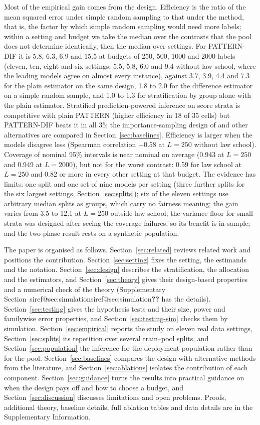 \documentclass[pdflatex,sn-mathphys-num,iicol]{sn-jnl}
\makeatletter
\theoremstyle{thmstyleone}
\theoremstyle{thmstyletwo}
\theoremstyle{thmstylethree}
\newcommand{\SIref}[1]{\ifcsname siref@#1\endcsname\csname siref@#1\endcsname\else\textbf{??}\fi}
\makeatother
\begin{document}
Most of the empirical gain comes from the design. Efficiency is the ratio of the mean squared error under simple random sampling to that under the method, that is, the factor by which simple random sampling would need more labels; within a setting and budget we take the median over the contrasts that the pool does not determine identically, then the median over settings. For PATTERN-DIF it is 5.8, 6.3, 6.9 and 15.5 at budgets of 250, 500, 1000 and 2000 labels (eleven, ten, eight and six settings; 5.5, 5.8, 6.0 and 9.4 without law school, where the leading models agree on almost every instance), against 3.7, 3.9, 4.4 and 7.3 for the plain estimator on the same design, 1.8 to 2.0 for the difference estimator on a simple random sample, and 1.0 to 1.3 for stratification by group alone with the plain estimator. Stratified prediction-powered inference \citep{fisch2024stratppi} on score strata is competitive with plain PATTERN (higher efficiency in 18 of 35 cells) but PATTERN-DIF beats it in all 35; the importance-sampling design of \citet{sawade2012active} and other alternatives are compared in Section~\ref{sec:baselines}. Efficiency is larger when the models disagree less (Spearman correlation $-0.58$ at $L=250$ without law school). Coverage of nominal 95\% intervals is near nominal on average (0.943 at $L=250$ and 0.949 at $L=2000$), but not for the worst contrast: 0.59 for law school at $L=250$ and 0.82 or more in every other setting at that budget. The evidence has limits: one split and one set of nine models per setting (three further splits for the six largest settings, Section~\ref{sec:splits}); six of the eleven settings use arbitrary median splits as groups, which carry no fairness meaning; the gain varies from 3.5 to 12.1 at $L=250$ outside law school; the variance floor for small strata was designed after seeing the coverage failures, so its benefit is in-sample; and the two-phase result rests on a synthetic population.

The paper is organised as follows. Section~\ref{sec:related} reviews related work and positions the contribution. Section~\ref{sec:setting} fixes the setting, the estimands and the notation. Section~\ref{sec:design} describes the stratification, the allocation and the estimators, and Section~\ref{sec:theory} gives their design-based properties and a numerical check of the theory (Supplementary Section~\SIref{sec:simulation} has the details). Section~\ref{sec:testing} gives the hypothesis tests and their size, power and familywise error properties, and Section~\ref{sec:testing-sim} checks them by simulation. Section~\ref{sec:empirical} reports the study on eleven real data settings, Section~\ref{sec:splits} its repetition over several train--pool splits, and Section~\ref{sec:population} the inference for the deployment population rather than for the pool. Section~\ref{sec:baselines} compares the design with alternative methods from the literature, and Section~\ref{sec:ablations} isolates the contribution of each component. Section~\ref{sec:guidance} turns the results into practical guidance on when the design pays off and how to choose a budget, and Section~\ref{sec:discussion} discusses limitations and open problems. Proofs, additional theory, baseline details, full ablation tables and data details are in the Supplementary Information.
\end{document}
